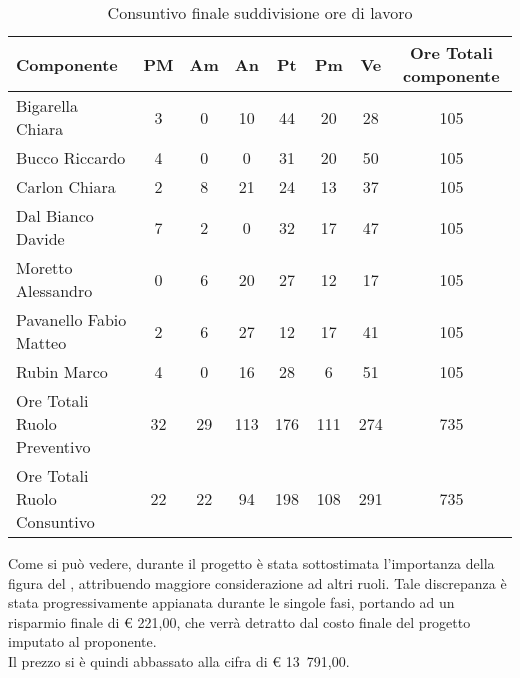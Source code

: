 	\begin{table}[H]
				\begin{center}
					\begin{tabular}{| l | c | c | c | c | c | c | c |}
						\hline
						Componente 					& PM	& Am	& An 		& Pt 		& Pm 	& Ve 	& Ore Totali componente \\ \hline
						
						Bigarella Chiara 			& 3		& 0		& 10 		& 44 		& 20		& 28 		& 105 \\
						Bucco Riccardo 				& 4& 0		& 0			& 31 	& 20		& 50 		& 105 \\
						Carlon Chiara				& 2		& 8 & 21 		& 24			& 13		& 37	& 105 \\
						Dal Bianco Davide 			& 7		& 2 & 0			& 32 		& 17		& 47	& 105 \\
						Moretto Alessandro 			& 0		& 6 	& 20 		& 27 		& 12		& 17 		& 105 \\
						Pavanello Fabio Matteo		& 2		& 6 & 27	& 12	& 17		& 41	& 105 \\
						Rubin Marco					& 4 	& 0		& 16 		& 28			& 6		& 51	& 105 \\ \hline \hline
						
						Ore Totali Ruolo Preventivo	& 32 	& 29 	& 113 		& 176 		& 111		& 274		& 735\\ 
						Ore Totali Ruolo Consuntivo	& 22 	& 22 	& 94 		& 198 		& 108		& 291		& 735\\ \hline
					\end{tabular}
				\end{center}
				\caption{Consuntivo finale suddivisione ore di lavoro}
			\end{table}
	
		Come si può vedere, durante il progetto è stata sottostimata l'importanza della figura del , attribuendo maggiore considerazione ad altri ruoli. Tale discrepanza è stata progressivamente appianata durante le singole fasi, portando ad un risparmio finale di \euro{} 221,00, che verrà detratto dal costo finale del progetto imputato al proponente.\\
		Il prezzo si è quindi abbassato alla cifra di \euro{} 13~791,00.